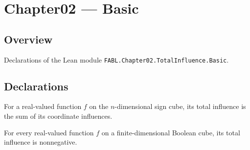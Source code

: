 \chapter{Chapter02 — Basic}
\section{Overview}

Declarations of the Lean module \texttt{FABL.Chapter02.TotalInfluence.Basic}.

\section{Declarations}

\begin{definition}
\label{FABL.totalInfluence}
\leanok
{}
For a real-valued function $f$ on the $n$-dimensional sign cube, its total influence is
the sum of its coordinate influences.
\end{definition}

\begin{theorem}
\label{FABL.totalInfluence_nonneg}
\leanok
{}
For every real-valued function $f$ on a finite-dimensional Boolean cube, its total
influence is nonnegative.
\end{theorem}

